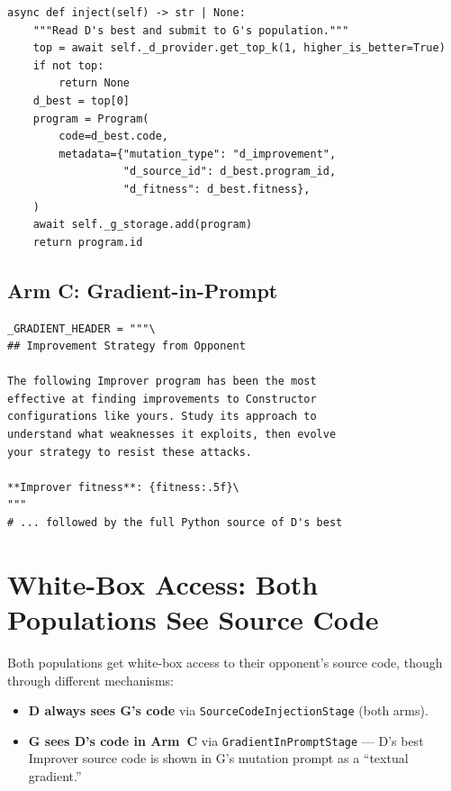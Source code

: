 \documentclass[11pt,a4paper]{article}
\begin{document}
\begin{lstlisting}[caption={CompositionInjectionHook (\texttt{composition\_injection.py:36--61})}]
async def inject(self) -> str | None:
    """Read D's best and submit to G's population."""
    top = await self._d_provider.get_top_k(1, higher_is_better=True)
    if not top:
        return None
    d_best = top[0]
    program = Program(
        code=d_best.code,
        metadata={"mutation_type": "d_improvement",
                  "d_source_id": d_best.program_id,
                  "d_fitness": d_best.fitness},
    )
    await self._g_storage.add(program)
    return program.id
\end{lstlisting}

\subsection{Arm C: Gradient-in-Prompt}

\begin{lstlisting}[caption={GradientInPromptStage prompt (\texttt{gradient\_prompt.py:24--42})}]
_GRADIENT_HEADER = """\
## Improvement Strategy from Opponent

The following Improver program has been the most
effective at finding improvements to Constructor
configurations like yours. Study its approach to
understand what weaknesses it exploits, then evolve
your strategy to resist these attacks.

**Improver fitness**: {fitness:.5f}\
"""
# ... followed by the full Python source of D's best
\end{lstlisting}

\section{White-Box Access: Both Populations See Source Code}

Both populations get white-box access to their opponent's source code, though through different mechanisms:

\begin{itemize}[nosep]
  \item \textbf{D always sees G's code} via \texttt{SourceCodeInjectionStage} (both arms).
  \item \textbf{G sees D's code in Arm~C} via \texttt{GradientInPromptStage} --- D's best Improver source code is shown in G's mutation prompt as a ``textual gradient.''
\end{itemize}
\end{document}
